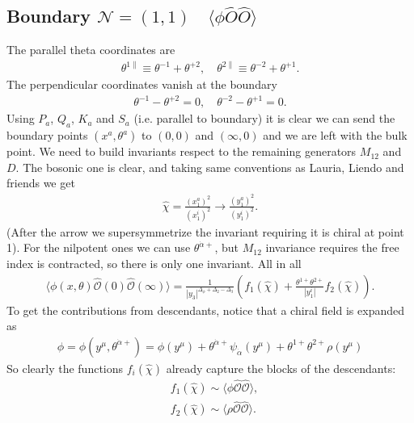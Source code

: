 \documentclass[letterpaper]{article}
\let\Oldsubsection\subsection
\renewcommand{\subsection}{\FloatBarrier\Oldsubsection}
\def\Nm{{\mathcal{N}}}
\def\Om{{\mathcal{O}}}
\def\ad{{\dot{\alpha}}}
\begin{document}
\subsection{Boundary \texorpdfstring{$\Nm=(1,1) \quad \langle \phi \hat O \hat O \rangle$}{} }
The parallel theta coordinates are
\begin{align}
\theta^{1\parallel} \equiv \theta^{-1} + \theta^{+2}, \quad
\theta^{2\parallel} \equiv \theta^{-2} + \theta^{+1}.
\end{align}
The perpendicular coordinates vanish at the boundary
\begin{align}
 \theta^{-1} - \theta^{+2} = 0, \quad
 \theta^{-2} - \theta^{+1} = 0.
\end{align}
Using $P_a$, $Q_a$, $K_a$ and $S_a$ (i.e. parallel to boundary) it is clear we can send the boundary points $(x^a, \theta^a)$ to $(0, 0)$ and $(\infty, 0)$ and we are left with the bulk point.
We need to build invariants respect to the remaining generators $M_{12}$ and $D$.
The bosonic one is clear, and taking same conventions as Lauria, Liendo and friends we get
\begin{align}
 \hat \chi = \frac{(x_1^a)^2}{(x_1^i)^2} \to \frac{(y_1^a)^2}{(y_1^i)^2}.
\end{align}
(After the arrow we supersymmetrize the invariant requiring it is chiral at point 1).
For the nilpotent ones we can use $\theta^{\ad+}$, but $M_{12}$ invariance requires the free index is contracted, so there is only one invariant.
All in all
\begin{align}
 \langle \phi(x, \theta) \hat \Om(0) \hat \Om(\infty) \rangle
 = \frac{1}{|y_3|^{\Delta_\phi + \Delta_2 - \Delta_3}} \left(
   f_1(\hat \chi)
   + \frac{\theta^{1+}\theta^{2+}}{|y_1^i|} f_2(\hat \chi)
 \right).
\end{align}
To get the contributions from descendants, notice that a chiral field is expanded as
\begin{align}
 \phi 
 = \phi(y^\mu, \theta^{\ad+})
 = \phi(y^\mu)
 + \theta^{\ad+} \psi_{\ad}(y^\mu)
 + \theta^{1+} \theta^{2+} \rho(y^\mu)
\end{align}
So clearly the functions $f_i(\hat \chi)$ already capture the blocks of the descendants:
\begin{align}
 & f_1(\hat \chi) \sim \langle \phi \hat \Om \hat \Om \rangle, \\
 & f_2(\hat \chi) \sim \langle \rho \hat \Om \hat \Om \rangle.
\end{align}
\end{document}
